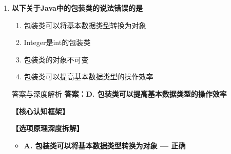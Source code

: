 \documentclass[12pt, a4paper]{ctexart}
\begin{document}
\begin{enumerate}[label=\textbf{\arabic*.}]
	      \begin{bluebox}{答案与深度解析}
		      \textbf{答案：A. lastIndexOf()}

		      \textbf{【选项原理深度拆解】}
					  \begin{itemize}[label={}, leftmargin=*, nosep]


		      \item \textbf{A. lastIndexOf() — 正确}
					  \begin{itemize}[label={}, nosep]
		      
			      \item int lastIndexOf(String str) 返回最后一次出现的索引
			      \item 未找到返回-1

					  \end{itemize}
		      \item \textbf{B/C/D — 错误}
					  \begin{itemize}[label={}, nosep]
		      
			      \item 这些方法不存在于String类
		      
		      

	      
					  \end{itemize}
					  \end{itemize}
\end{bluebox}

	      \vspace{1em}

	\item \textbf{以下关于Java中的包装类的说法错误的是}
	      \begin{enumerate}[label=\Alph*.]
		      \item 包装类可以将基本数据类型转换为对象
		      \item Integer是int的包装类
		      \item 包装类的对象不可变
		      \item 包装类可以提高基本数据类型的操作效率
	      \end{enumerate}

	      \begin{bluebox}{答案与深度解析}
		      \textbf{答案：D. 包装类可以提高基本数据类型的操作效率}

		      \textbf{【核心认知框架】}

		      \textbf{【选项原理深度拆解】}
					  \begin{itemize}[label={}, leftmargin=*, nosep]


		      \item \textbf{A. 包装类可以将基本数据类型转换为对象 — 正确}
					  \begin{itemize}[label={}, nosep]
		      

\end{itemize}
\end{itemize}
\end{bluebox}
\end{enumerate}
\end{document}
